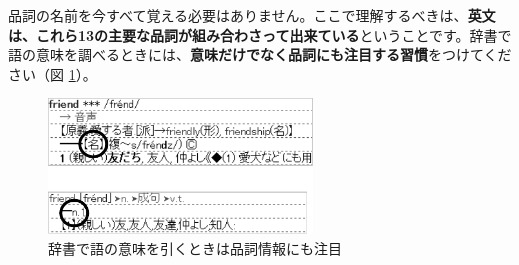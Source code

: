 \documentclass[titlepage]{jsarticle}
\begin{document}
品詞の名前を今すべて覚える必要はありません。ここで理解するべきは、{\bf 英文は、これら13の主要な品詞が組み合わさって出来ている}ということです。辞書で語の意味を調べるときには、{\bf 意味だけでなく品詞にも注目する習慣}をつけてください（図 \ref{fig3}）。
 \begin{figure}[htbp]
  \begin{center}
   \includegraphics[width=7cm]{./figure/fig3.pdf}
   \caption{辞書で語の意味を引くときは品詞情報にも注目}
   \label{fig3}
  \end{center}
 \end{figure}
 
\end{document}
